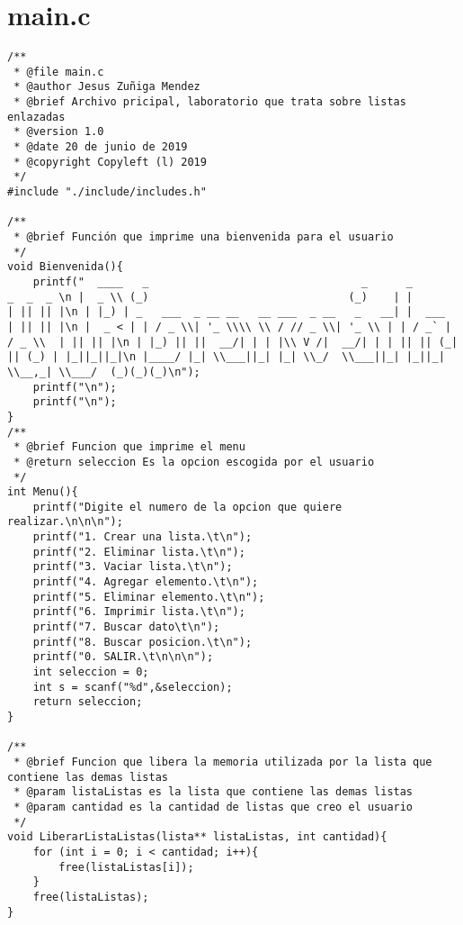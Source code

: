 \section{main.c}

\begin{verbatim}
/**
 * @file main.c
 * @author Jesus Zuñiga Mendez
 * @brief Archivo pricipal, laboratorio que trata sobre listas enlazadas
 * @version 1.0
 * @date 20 de junio de 2019
 * @copyright Copyleft (l) 2019
 */
#include "./include/includes.h"

/**
 * @brief Función que imprime una bienvenida para el usuario
 */
void Bienvenida(){
    printf("  ____   _                                 _      _          _  _  _ \n |  _ \\ (_)                               (_)    | |        | || || |\n | |_) | _   ___  _ __ __   __ ___  _ __   _   __| |  ___   | || || |\n |  _ < | | / _ \\| '_ \\\\ \\ / // _ \\| '_ \\ | | / _` | / _ \\  | || || |\n | |_) || ||  __/| | | |\\ V /|  __/| | | || || (_| || (_) | |_||_||_|\n |____/ |_| \\___||_| |_| \\_/  \\___||_| |_||_| \\__,_| \\___/  (_)(_)(_)\n"); 
    printf("\n");
    printf("\n");
}
/**
 * @brief Funcion que imprime el menu
 * @return seleccion Es la opcion escogida por el usuario
 */
int Menu(){
    printf("Digite el numero de la opcion que quiere realizar.\n\n\n");
    printf("1. Crear una lista.\t\n");
    printf("2. Eliminar lista.\t\n");
    printf("3. Vaciar lista.\t\n");
    printf("4. Agregar elemento.\t\n");
    printf("5. Eliminar elemento.\t\n");
    printf("6. Imprimir lista.\t\n");
    printf("7. Buscar dato\t\n");
    printf("8. Buscar posicion.\t\n");
    printf("0. SALIR.\t\n\n\n");
    int seleccion = 0;
    int s = scanf("%d",&seleccion);
    return seleccion;
}

/**
 * @brief Funcion que libera la memoria utilizada por la lista que contiene las demas listas
 * @param listaListas es la lista que contiene las demas listas
 * @param cantidad es la cantidad de listas que creo el usuario
 */
void LiberarListaListas(lista** listaListas, int cantidad){
    for (int i = 0; i < cantidad; i++){
        free(listaListas[i]);
    }
    free(listaListas);
}



\end{verbatim}
